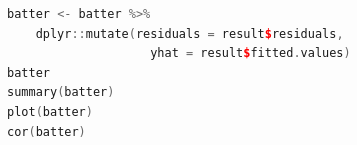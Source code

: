 \begin{lstlisting}[language=c++,label={code:11_05},caption={Other information on regression analysis}]
batter <- batter %>% 
    dplyr::mutate(residuals = result$residuals,
                    yhat = result$fitted.values) 
batter
summary(batter)
plot(batter)
cor(batter)
\end{lstlisting}
